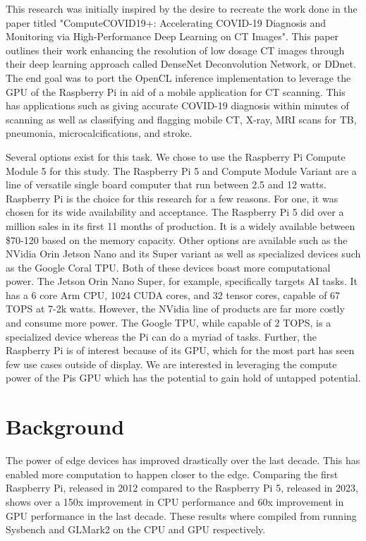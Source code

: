 \documentclass[conference]{IEEEtran}
\begin{document}
 This research was initially inspired by the desire to recreate the work done in the paper titled 
 "ComputeCOVID19+: Accelerating COVID-19 Diagnosis and Monitoring via High-Performance Deep Learning on CT Images"\cite{goel_computecovid19_2021}.
 This paper outlines their work enhancing the resolution of low dosage CT images through their deep
 learning approach called DenseNet Deconvolution Network, or DDnet. The end goal was to port the 
 OpenCL inference implementation to leverage the GPU of the Raspberry Pi in aid of a mobile application for CT scanning.
 This has applications such as giving accurate COVID-19 diagnosis within minutes of scanning\cite{goel_computecovid19_2021} as well as classifying
and flagging mobile CT, X-ray, MRI scans for TB, pneumonia, microcalcifications, and stroke\cite{edge_device_machine_learning_poc}.
 
 Several options exist for this task. We chose to use the Raspberry Pi Compute Module 5 for 
 this study. The Raspberry Pi 5 and Compute Module Variant are a line of versatile single board computer 
 that run between 2.5 and 12 watts. 
 Raspberry Pi is the choice for this research for a few reasons. For one, 
 it was chosen for its wide availability and acceptance. The Raspberry Pi 5 did over a million 
 sales in its first 11 months of production\cite{king_revenue_2024}. It is a widely available between \$70-120 based on 
 the memory capacity. Other options are available such as the NVidia Orin Jetson Nano and 
 its Super variant as well as specialized devices such as the Google Coral TPU. Both of these devices 
 boast more computational power. The Jetson Orin Nano Super, for example, specifically targets AI tasks.
 It has a 6 core Arm CPU, 1024 CUDA cores, and 32 tensor cores, capable of 67 TOPS at 
 7-2k watts\cite{jetson_orin_nano}. However, the NVidia line of products are far more 
 costly and consume more power. The Google TPU, while capable of 2 TOPS, is a specialized device whereas the Pi can 
 do a myriad of tasks. Further, the Raspberry Pi is of interest because of its GPU, which 
 for the most part has seen few use cases outside of display. We are interested in leveraging 
 the compute power of the Pis GPU which has the potential to gain hold of untapped potential.
 
 \section{Background}

 The power of edge devices has improved drastically over the last decade. 
 This has enabled more computation to happen closer to the edge. Comparing the 
 first Raspberry Pi, released in 2012 compared to the Raspberry Pi 5, released in 
 2023, shows over a 150x improvement in CPU performance and 60x improvement in 
 GPU performance in the last decade. These results where compiled from running 
 Sysbench and GLMark2 on the CPU and GPU respectively.
\end{document}
